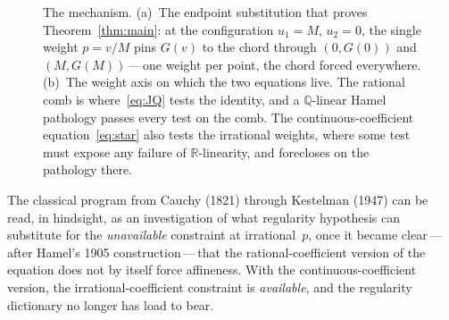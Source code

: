 \documentclass{article}
\theoremstyle{plain}
\theoremstyle{definition}
\newcommand{\R}{\mathbb{R}}
\newcommand{\Q}{\mathbb{Q}}
\begin{document}
\begin{figure}[ht]
{%
}
\caption{The mechanism. (a)~The endpoint substitution that proves
Theorem~\ref{thm:main}: at the configuration $u_1=M$, $u_2=0$, the
single weight $p=v/M$ pins $G(v)$ to the chord through $(0,G(0))$ and
$(M,G(M))$\,---\,one weight per point, the chord forced everywhere.
(b)~The weight axis on which the two equations live. The rational comb
is where~\eqref{eq:JQ} tests the identity, and a $\Q$-linear Hamel
pathology passes every test on the comb. The continuous-coefficient
equation~\eqref{eq:star} also tests the irrational weights, where some test must expose any failure of $\R$-linearity, and forecloses on the
pathology there.}
\label{fig:mechanism}
\end{figure}

The classical program from Cauchy (1821) through Kestelman (1947)
can be read, in hindsight, as an investigation of what regularity
hypothesis can substitute for the \emph{unavailable} constraint at
irrational~$p$, once it became clear\,---\,after Hamel's 1905
construction\,---\,that the rational-coefficient version of the
equation does not by itself force affineness. With the
continuous-coefficient version, the irrational-coefficient constraint
is \emph{available}, and the regularity dictionary no longer has load to bear.

\end{document}
